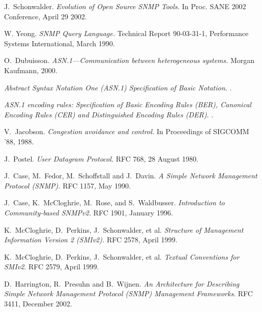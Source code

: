 \documentclass[reprint,natbib,9pt]{sigplanconf}
\begin{document}
\begin{thebibliography}{10}

J.~Schonwalder.
\newblock \textsl{Evolution of Open Source SNMP Tools.}
\newblock In Proc. SANE 2002 Conference, April 29 2002.

W. Yeong.
\newblock \textsl{SNMP Query Language.}
\newblock Technical Report 90-03-31-1, Performance Systems International, March 1990.

O.~Dubuisson.
\newblock \textsl{ASN.1---Communication between heterogeneous systems.}
\newblock Morgan Kaufmann, 2000.

\textsl{Abstract Syntax Notation One (ASN.1) Specification of Basic
  Notation.}
.

\textsl{ASN.1 encoding rules: Specification of Basic Encoding Rules
  (BER), Canonical Encoding Rules (CER) and Distinguished Encoding Rules
  (DER).}
.

V.~Jacobson.
\newblock \textsl{Congestion avoidance and control.}
\newblock In Proceedings of SIGCOMM '88, 1988.


J.~Postel.
\newblock \textsl{User Datagram Protocol.}
\newblock RFC 768, 28 August 1980.

J.~Case, M.~Fedor, M.~Schoffstall and J.~Davin.
\newblock \textsl{A Simple Network Management Protocol (SNMP).}
\newblock RFC 1157, May 1990.

J.~Case, K.~McCloghrie, M.~Rose, and S.~Waldbusser.
\newblock \textsl{Introduction to Community-based SNMPv2.}
\newblock RFC 1901, January 1996.

K.~McCloghrie, D.~Perkins, J.~Schonwalder, et al.
\newblock \textsl{Structure of Management Information Version 2 (SMIv2).}
\newblock RFC 2578, April 1999.

K.~McCloghrie, D.~Perkins, J.~Schonwalder, et al.
\newblock \textsl{Textual Conventions for SMIv2}.
\newblock RFC 2579, April 1999.

D.~Harrington, R.~Presuhn and B.~Wijnen.
\newblock \textsl{An Architecture for Describing
	Simple Network Management Protocol (SNMP) Management Frameworks}.
\newblock RFC 3411, December 2002.


\end{thebibliography}
\end{document}
